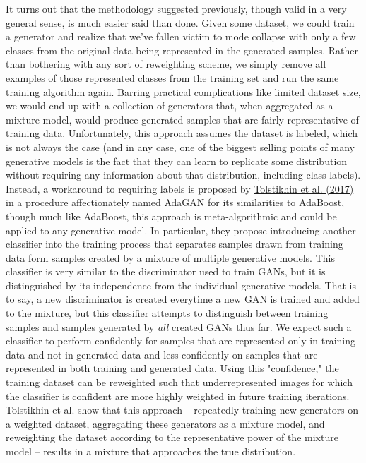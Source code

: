 \documentclass[submission]{eptcs}
\begin{document}
It turns out that the methodology suggested previously, though valid in a very general sense, is much easier said than done. Given some dataset, we could train a generator and realize that we've fallen victim to mode collapse with only a few classes from the original data being represented in the generated samples. Rather than bothering with any sort of reweighting scheme, we simply remove all examples of those represented classes from the training set and run the same training algorithm again. Barring practical complications like limited dataset size, we would end up with a collection of generators that, when aggregated as a mixture model, would produce generated samples that are fairly representative of training data. Unfortunately, this approach assumes the dataset is labeled, which is not always the case (and in any case, one of the biggest selling points of many generative models is the fact that they can learn to replicate some distribution without requiring any information about that distribution, including class labels). Instead, a workaround to requiring labels is proposed by \href{https://arxiv.org/pdf/1701.02386.pdf}{Tolstikhin et al. (2017)} in a procedure affectionately named AdaGAN for its similarities to AdaBoost, though much like AdaBoost, this approach is meta-algorithmic and could be applied to any generative model. In particular, they propose introducing another classifier into the training process that separates samples drawn from training data form samples created by a mixture of multiple generative models. This classifier is very similar to the discriminator used to train GANs, but it is distinguished by its independence from the individual generative models. That is to say, a new discriminator is created everytime a new GAN is trained and added to the mixture, but this classifier attempts to distinguish between training samples and samples generated by \emph{all} created GANs thus far. We expect such a classifier to perform confidently for samples that are represented only in training data and not in generated data and less confidently on samples that are represented in both training and generated data. Using this "confidence," the training dataset can be reweighted such that underrepresented images for which the classifier is confident are more highly weighted in future training iterations. Tolstikhin et al. show that this approach -- repeatedly training new generators on a weighted dataset, aggregating these generators as a mixture model, and reweighting the dataset according to the representative power of the mixture model -- results in a mixture that approaches the true distribution. \\
\end{document}
